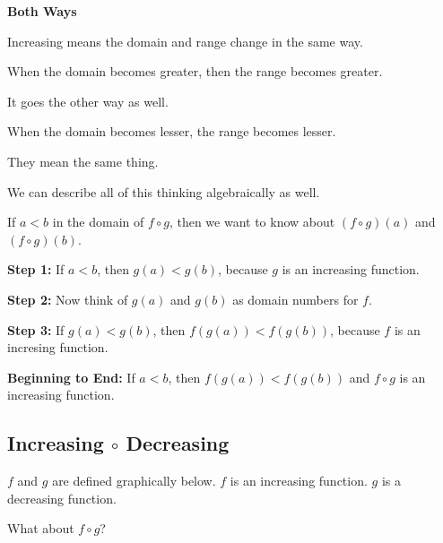 \documentclass{ximera}
\begin{document}
\begin{warning} \textbf{\textcolor{red!70!black}{Both Ways}}

Increasing means the domain and range change in the same way.

When the domain becomes greater, then the range becomes greater.

It goes the other way as well.

When the domain becomes lesser, the range becomes lesser.

They mean the same thing.


\end{warning}



We can describe all of this thinking algebraically as well. 


If $a < b$ in the domain of $f \circ g$, then we want to know about $(f \circ g)(a)$  and $(f \circ g)(b)$.



\textbf{Step 1:}  If $a < b$, then $g(a) < g(b)$, because $g$ is an increasing function.


\textbf{Step 2:}  Now think of $g(a)$  and $g(b)$ as domain numbers for $f$.


\textbf{Step 3:}  If $g(a) < g(b)$, then $f(g(a)) < f(g(b))$, because $f$ is an incresing function.


\textbf{Beginning to End:} If $a < b$, then $f(g(a)) < f(g(b))$ and $f \circ g$ is an increasing function.




















\subsection*{Increasing $\circ$ Decreasing}



$f$ and $g$ are defined graphically below.  $f$ is an increasing function.  $g$ is a decreasing function. 

What about $f \circ g$? 
\end{document}
